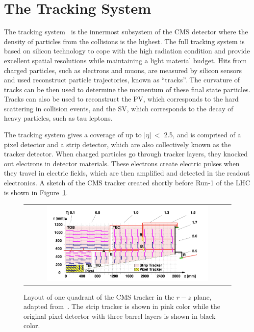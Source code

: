 \section{The Tracking System}
\label{sec:TK}

The tracking system~\cite{CMS:1997tlf} is the innermost subsystem of the \ac{CMS} detector where the density of particles from the collisions is the highest. The full tracking system is based on silicon technology to cope with the high radiation condition and provide excellent spatial resolutions while maintaining a light material budget. Hits from charged particles, such as electrons and muons, are measured by silicon sensors and used reconstruct particle trajectories, known as ``tracks''. The curvature of tracks can be then used to determine the momentum of these final state particles. Tracks can also be used to reconstruct the \ac{PV}, which corresponds to the hard scattering in collision events, and the \ac{SV}, which corresponds to the decay of heavy particles, such as tau leptons. 

The tracking system gives a coverage of up to $|\eta|~<$ 2.5, and is comprised of a pixel detector and a strip detector, which are also collectively known as the tracker detector. When charged particles go through tracker layers, they knocked out electrons in detector materials. These electrons create electric pulses when they travel in electric fields, which are then amplified and detected in the readout electronics. A sketch of the \ac{CMS} tracker created shortly before Run-1 of the \ac{LHC} is shown in Figure~\ref{fig:Tracker}.

\begin{figure}[tbh!]
 \begin{center}
 \begin{tabular}{c}
 \includegraphics[width=0.8\textwidth]{figures/Part2/CMS/Tracker}
 \end{tabular}
 \caption{Layout of one quadrant of the \ac{CMS} tracker in the $r-z$ plane, adapted from~\cite{CMS:2009dvy}. The strip tracker is shown in pink color while the original pixel detector with three barrel layers is shown in black color.}
 \label{fig:Tracker}
 \end{center}
\end{figure}

